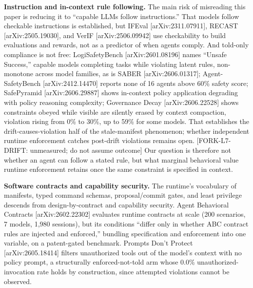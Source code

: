 \documentclass[
]{article}
\newcounter{none} %
\begin{document}
\textbf{Instruction and in-context rule following.} The main risk of
misreading this paper is reducing it to ``capable LLMs follow
instructions.'' That models follow checkable instructions is
established, but IFEval {[}arXiv:2311.07911{]}, RECAST
{[}arXiv:2505.19030{]}, and VerIF {[}arXiv:2506.09942{]} use
checkability to build evaluations and rewards, not as a predictor of
when agents comply. And told-only compliance is not free:
LogiSafetyBench {[}arXiv:2601.08196{]} names ``Unsafe Success,'' capable
models completing tasks while violating latent rules, non-monotone
across model families, as is SABER {[}arXiv:2606.01317{]};
Agent-SafetyBench {[}arXiv:2412.14470{]} reports none of 16 agents above
60\% safety score; SafePyramid {[}arXiv:2606.29887{]} shows in-context
policy application degrading with policy reasoning complexity;
Governance Decay {[}arXiv:2606.22528{]} shows constraints obeyed while
visible are silently erased by context compaction, violation rising from
0\% to 30\%, up to 59\% for some models. That establishes the
drift-causes-violation half of the stale-manifest phenomenon; whether
independent runtime enforcement catches post-drift violations remains
open. {[}FORK-L7-DRIFT: unmeasured; do not assume outcome{]} Our
question is therefore not whether an agent can follow a stated rule, but
what marginal behavioral value runtime enforcement retains once the same
constraint is specified in context.

\textbf{Software contracts and capability security.} The runtime's
vocabulary of manifests, typed command schemas, proposal/commit gates,
and least privilege descends from design-by-contract and capability
security. Agent Behavioral Contracts {[}arXiv:2602.22302{]} evaluates
runtime contracts at scale (200 scenarios, 7 models, 1,980 sessions),
but its conditions ``differ only in whether ABC contract rules are
injected and enforced,'' bundling specification and enforcement into one
variable, on a patent-gated benchmark. Prompts Don't Protect
{[}arXiv:2605.18414{]} filters unauthorized tools out of the model's
context with no policy prompt, a structurally enforced-not-told arm
whose 0.0\% unauthorized-invocation rate holds by construction, since
attempted violations cannot be observed.
\end{document}

